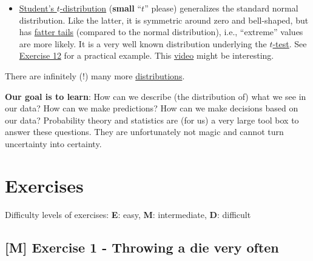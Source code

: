 \documentclass[
]{book}
\begin{document}
\begin{itemize}
  \href{https://en.wikipedia.org/wiki/Exponential_distribution}{Exponential distribution}.
  For instance used in survival analysis to model the time until an event (e.g.~refrigerator stops working) occurs.
  This \href{https://www.youtube.com/watch?v=2kg1O0j1J9c&ab_channel=zedstatistics}{video} might be interesting.
\item
  \href{https://en.wikipedia.org/wiki/Student\%27s_t-distribution}{Student's \(t\)-distribution} (\textbf{small} ``\(t\)'' please) generalizes
  the standard normal distribution. Like the latter, it is symmetric around zero and bell-shaped, but
  has \href{https://en.wikipedia.org/wiki/Fat-tailed_distribution}{fatter tails} (compared to the normal distribution), i.e.,
  ``extreme'' values are more likely. It is a very well known distribution underlying the \href{https://en.wikipedia.org/wiki/Student\%27s_t-test}{\(t\)-test}.
  See \hyperref[exercise12]{Exercise 12} for a practical example.
  This \href{https://www.youtube.com/watch?v=Uv6nGIgZMVw&ab_channel=jbstatistics}{video} might be interesting.
\end{itemize}

There are infinitely (!) many more \href{https://en.wikipedia.org/wiki/List_of_probability_distributions}{distributions}.

\textbf{Our goal is to learn}: How can we describe (the distribution of) what we see in our data?
How can we make predictions? How can we make decisions based on our data?
Probability theory and statistics are (for us) a very large tool box to answer these questions.
They are unfortunately not magic and cannot turn uncertainty into certainty.

\section{Exercises}\label{exercises}

Difficulty levels of exercises:
\textbf{E}: easy,
\textbf{M}: intermediate,
\textbf{D}: difficult

\subsection{{[}M{]} Exercise 1 - Throwing a die very often}\label{exercise1}
\end{document}

